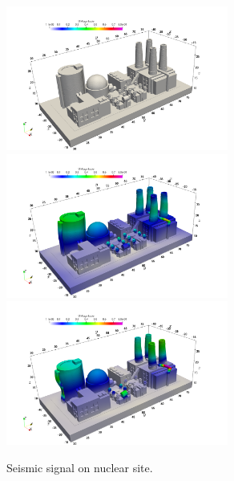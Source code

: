\documentclass{report}
\begin{document}
\begin{figure}
    \centering
    \includegraphics[width=0.65\textwidth]{./Images/t001.png}        
    \includegraphics[width=0.65\textwidth]{./Images/t100.png}    
    \includegraphics[width=0.65\textwidth]{./Images/t199.png} 
    \caption{Seismic signal on nuclear site.}
    \label{fig:nuclearplant}
\end{figure}

\printbibliography
\end{document}

